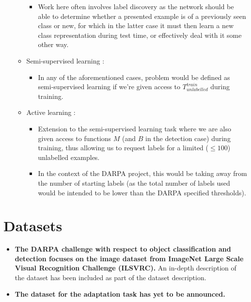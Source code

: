 \documentclass{article}
\begin{document}
\begin{itemize}
\begin{itemize}
\begin{itemize}
                \item Work here often involves label discovery as the network should be able to determine whether a presented example is of a previously seen class or new, for which in the latter case it must then learn a new class representation during test time, or effectively deal with it some other way.
            \end{itemize}
            \item Semi-supervised learning \cite{DBLP:journals/corr/boney2017}:
            \begin{itemize}
                \item In any of the aforementioned cases, problem would be defined as semi-supervised learning if we're given access to $T_{unlabelled}^{train}$ during training.
            \end{itemize}
            \item Active learning \cite{DBLP:journals/corr/boney2017}:
            \begin{itemize}
                \item Extension to the semi-supervised learning task where we are also given access to functions $M$ (and $B$ in the detection case) during training, thus allowing us to request labels for a limited ($\le100$) unlabelled examples.
                \item In the context of the DARPA project, this would be taking away from the number of starting labels (as the total number of labels used would be intended to be lower than the DARPA specified thresholds).
            \end{itemize}
        \end{itemize}
    \end{itemize}
    
\section{Datasets}
\begin{itemize}
    \item \textbf{The DARPA challenge with respect to object classification and detection focuses on the image dataset from ImageNet Large Scale Visual Recognition Challenge (ILSVRC).} An in-depth description of the dataset has been included as part of the dataset description.
    \item \textbf{The dataset for the adaptation task has yet to be announced.}
\end{itemize}
    


\end{document}
